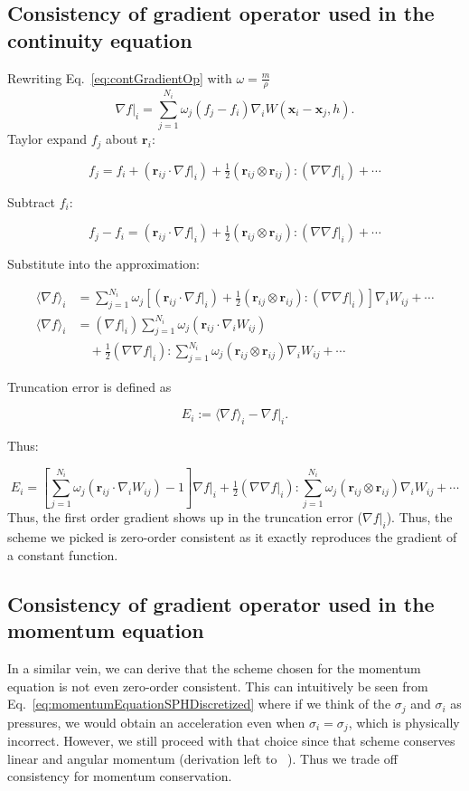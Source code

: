 \documentclass{article}
\newcommand{\vx}{\mathbf{x}}
\newcommand{\ri}{\mathbf{r}_i}
\newcommand{\rij}{\mathbf{r}_{ij}}
\newcommand{\grad}{\nabla}
\newcommand{\Hess}{\nabla\nabla}
\begin{document}
\subsection*{Consistency of gradient operator used in the continuity equation}
Rewriting Eq.~\ref{eq:contGradientOp} with $\omega = \frac{m}{\rho}$
\begin{equation}
    \label{eq:contGradientOp2}
    \nabla f|_i = \sum_{j=1}^{N_i}  \omega_j \left( f_j - f_i \right) \nabla_i W(\vx_i - \vx_j, h).
\end{equation}
\noindent Taylor expand \(f_j\) about \(\ri\):

\[
f_j = f_i + (\rij \cdot \grad f|_i) + \tfrac{1}{2}(\rij \otimes \rij) : (\Hess f|_i) + \cdots
\]

\noindent Subtract \(f_i\):

\[
f_j - f_i = (\rij \cdot \grad f|_i) + \tfrac{1}{2}(\rij \otimes \rij) : (\Hess f|_i) + \cdots
\]

\noindent Substitute into the approximation:

\begin{align*}
\langle \nabla f \rangle_i &= \sum_{j=1}^{N_i} \omega_j \left[ (\rij \cdot \grad f|_i) + \tfrac{1}{2}(\rij \otimes \rij) : (\Hess f|_i) \right] \nabla_i W_{ij} + \cdots \\
\langle \nabla f \rangle_i &= (\grad f|_i)\sum_{j=1}^{N_i}\omega_j(\rij \cdot \nabla_i W_{ij}) \\
&\quad + \tfrac{1}{2}(\Hess f|_i) : \sum_{j=1}^{N_i}\omega_j(\rij \otimes \rij)\nabla_i W_{ij} + \cdots
\end{align*}

\noindent Truncation error is defined as

\[
E_i := \langle \nabla f \rangle_i - \nabla f|_i.
\]

\noindent Thus:

\[
E_i = \left[\sum_{j=1}^{N_i}\omega_j(\rij \cdot \nabla_i W_{ij}) - 1\right]\nabla f|_i 
+ \tfrac{1}{2}(\Hess f|_i) : \sum_{j=1}^{N_i}\omega_j(\rij \otimes \rij)\nabla_i W_{ij} + \cdots
\]
Thus, the first order gradient shows up in the truncation error ($\nabla f|_i$). Thus, the scheme we picked is zero-order consistent as it exactly reproduces the gradient of a constant function. 
\subsection*{Consistency of gradient operator used in the momentum equation}
In a similar vein, we can derive that the scheme chosen for the momentum equation is not even zero-order consistent. This can intuitively be seen from Eq.~\ref{eq:momentumEquationSPHDiscretized} where if we think of the $\sigma_j$ and $\sigma_i$ as pressures, we would obtain an acceleration even when $\sigma_i = \sigma_j$, which is physically incorrect. However, we still proceed with that choice since that scheme conserves linear and angular momentum (derivation left to ~\citep{liu2010sph}). Thus we trade off consistency for momentum conservation.
\end{document}
